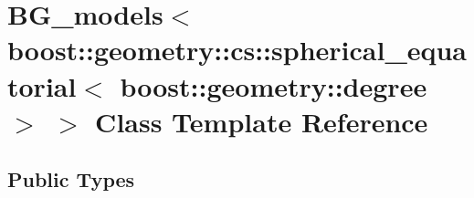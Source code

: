 \hypertarget{classBG__models_3_01boost_1_1geometry_1_1cs_1_1spherical__equatorial_3_01boost_1_1geometry_1_1degree_01_4_01_4}{}\section{B\+G\+\_\+models$<$ boost\+:\+:geometry\+:\+:cs\+:\+:spherical\+\_\+equatorial$<$ boost\+:\+:geometry\+:\+:degree $>$ $>$ Class Template Reference}
\label{classBG__models_3_01boost_1_1geometry_1_1cs_1_1spherical__equatorial_3_01boost_1_1geometry_1_1degree_01_4_01_4}
\subsection*{Public Types}
